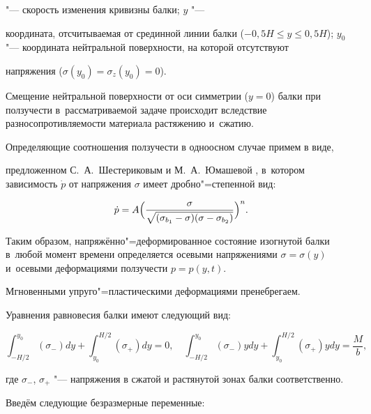 "--- скорость изменения кривизны балки; $y$ "---

координата, отсчитываемая от срединной линии балки \linebreak \mbox{($-0,5 H \leq y \leq 0,5H$)}; $y_0$ "--- координата нейтральной поверхности, на которой отсутствуют

напряжения ($\sigma (y_0)=\sigma _z (y_0) =0$). 

Смещение нейтральной поверхности от оси симметрии ($y=0$) балки при ползучести в~рассматриваемой задаче происходит вследствие разносопротивляемости материала растяжению и~сжатию.



Определяющие соотношения ползучести в одноосном случае примем в виде,

предложенном С.~А.~Шестериковым и М.~А.~Юмашевой \cite{loko:bib14,loko:bib15}, в~котором зависимость $\dot{p}$ от напряжения $\sigma$ имеет дробно"=степенной вид:

\begin{equation}

\label{loko:eq2}

\dot {p}=A\Bigl( \frac{\sigma }{\sqrt {(\sigma _{b_1} -\sigma ) (\sigma -\sigma _{b_2})} }\Bigr)^n.

\end{equation}

Таким образом, напряжённо"=деформированное состояние изогнутой балки в~любой момент времени определяется осевыми напряжениями $\sigma =\sigma (y)$ и~осевыми деформациями ползучести $p=p(y, t)$. 

Мгновенными упруго"=пластическими деформациями пренебрегаем.



Уравнения равновесия балки имеют следующий вид:

\begin{equation}

\label{loko:eq3}

\int_{-{H}/{2}}^{y_0} (\sigma _-)dy + \int_{y_0}^{{H}/{2}} (\sigma _+)dy=0,\quad 

\int_{-{H}/{2}}^{y_0} (\sigma _-)ydy + \int_{y_0}^{{H}/{2}} (\sigma _+ )ydy =\frac{M}{b},

\end{equation}

где $\sigma_{-}$, $\sigma_{+}$ "--- напряжения в сжатой и растянутой зонах балки соответственно.



Введём следующие безразмерные переменные:

